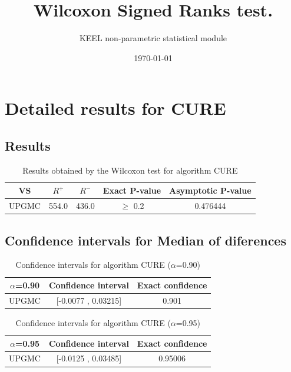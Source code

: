 \documentclass[a4paper,10pt]{article}
\title{Wilcoxon Signed Ranks test.}
\date{\today}
\author{KEEL non-parametric statistical module}
\begin{document}
\pagestyle{empty}
\maketitle
\thispagestyle{empty}



\section{Detailed results for CURE}


\subsection{Results}

\begin{table}[!htp]
\centering\small
\begin{tabular}{
|c|c|c|c|c|}
\hline
 VS & $R^{+}$ & $R^{-}$ & Exact P-value & Asymptotic P-value \\ \hline 
UPGMC & 554.0 & 436.0 & $\geq$ 0.2 & 0.476444\\ \hline 

\end{tabular}
\caption{Results obtained by the Wilcoxon test for algorithm CURE}
\end{table}

\subsection{Confidence intervals for Median of diferences}

\begin{table}[!htp]
\centering\small
\begin{tabular}{
|c|c|c|}
\hline
 $\alpha$=0.90 & Confidence interval & Exact confidence \\ \hline 
UPGMC & [-0.0077 , 0.03215] & 0.901\\ \hline 

\end{tabular}
\caption{Confidence intervals for algorithm CURE ($\alpha$=0.90)}
\end{table}
\begin{table}[!htp]
\centering\small
\begin{tabular}{
|c|c|c|}
\hline
 $\alpha$=0.95 & Confidence interval & Exact confidence \\ \hline 
UPGMC & [-0.0125 , 0.03485] & 0.95006\\ \hline 

\end{tabular}
\caption{Confidence intervals for algorithm CURE ($\alpha$=0.95)}
\end{table}
\end{document}
